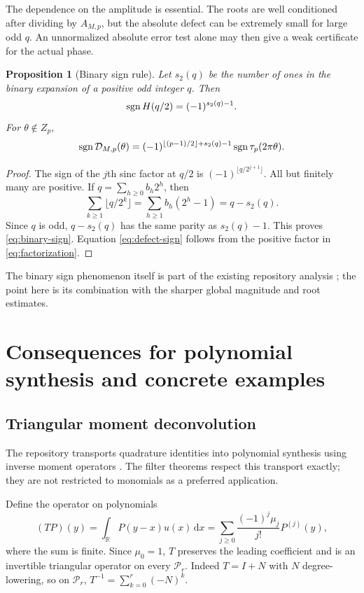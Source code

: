 \documentclass[11pt,a4paper]{article}
\numberwithin{equation}{section}
\newtheorem{proposition}[theorem]{Proposition}
\theoremstyle{definition}
\theoremstyle{remark}
\newcommand{\R}{\mathbb R}\newcommand{\Z}{\mathbb Z}\newcommand{\N}{\mathbb N}
\newcommand{\dd}{\,\mathrm d}\newcommand{\ii}{\mathrm i}
\newcommand{\Pol}{\mathcal P}\newcommand{\norm}[1]{\left\lVert#1\right\rVert}
\begin{document}
The dependence on the amplitude is essential. The roots are well
conditioned after dividing by $A_{M,p}$, but the absolute defect can be
extremely small for large odd $q$. An unnormalized absolute error test
alone may then give a weak certificate for the actual phase.

\begin{proposition}[Binary sign rule]
\label{prop:sign}
Let $s_2(q)$ be the number of ones in the binary expansion of a positive
odd integer $q$. Then
\begin{equation}
 \operatorname{sgn} H(q/2)=(-1)^{s_2(q)-1}.
 \label{eq:binary-sign}
\end{equation}
For $\theta\notin Z_p$,
\begin{equation}
 \operatorname{sgn}\mathcal D_{M,p}(\theta)
 =(-1)^{\lfloor(p-1)/2\rfloor+s_2(q)-1}
   \operatorname{sgn}\tau_p(2\pi\theta).
 \label{eq:defect-sign}
\end{equation}
\end{proposition}
\begin{proof}
The sign of the $j$th sinc factor at $q/2$ is
$(-1)^{\lfloor q/2^{j+1}\rfloor}$. All but finitely many are positive.
If $q=\sum_{h\ge0}b_h2^h$, then
\[
 \sum_{k\ge1}\lfloor q/2^k\rfloor
 =\sum_{h\ge1}b_h(2^h-1)=q-s_2(q).
\]
Since $q$ is odd, $q-s_2(q)$ has the same parity as $s_2(q)-1$.
This proves \eqref{eq:binary-sign}. Equation \eqref{eq:defect-sign}
follows from the positive factor in \eqref{eq:factorization}.
\end{proof}

The binary sign phenomenon itself is part of the existing repository
analysis \cite{repoComb}; the point here is its combination with the
sharper global magnitude and root estimates.

\section{Consequences for polynomial synthesis and concrete examples}

\subsection{Triangular moment deconvolution}

The repository transports quadrature identities into polynomial synthesis
using inverse moment operators \cite{repoLean}. The filter theorems respect
this transport exactly; they are not restricted to monomials as a preferred
application.

Define the operator on polynomials
\begin{equation}
 (TP)(y)=\int_\R P(y-x)u(x)\dd x
 =\sum_{j\ge0}\frac{(-1)^j\mu_j}{j!}P^{(j)}(y),
 \label{eq:moment-operator}
\end{equation}
where the sum is finite. Since $\mu_0=1$, $T$ preserves the leading
coefficient and is an invertible triangular operator on every $\Pol_r$.
Indeed $T=I+N$ with $N$ degree-lowering, so on $\Pol_r$,
$T^{-1}=\sum_{k=0}^r(-N)^k$.
\end{document}
